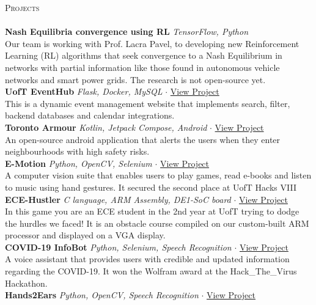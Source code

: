 \documentclass[a4paper]{article}
\newcommand{\lineunder} {
    \vspace*{-8pt} \\
    \hspace*{-18pt} \hrulefill \\
}
\newcommand{\header} [1] {
    {\hspace*{-18pt}\vspace*{6pt} \textsc{#1}}
    \vspace*{-6pt} \lineunder
}
\begin{document}
\header{Projects}
{\textbf{Nash Equilibria convergence using RL}} {\sl TensorFlow, Python} \\
Our team is working with Prof. Lacra Pavel, to developing new Reinforcement Learning (RL) algorithms that seek convergence to a Nash Equilibrium in networks
 with partial information like those found in autonomous vehicle networks and smart power grids. The research is not open-source yet.\\
\vspace*{2mm}
{\textbf{UofT EventHub}} {\sl Flask, Docker, MySQL} $\cdot$ \href{https://netninjahub.onrender.com/}{View Project}\\
This is a dynamic event management website that implements search, filter, backend databases and calendar integrations. \\
\vspace*{2mm}
{\textbf{Toronto Armour}} {\sl Kotlin, Jetpack Compose, Android} $\cdot$ \href{https://tinyurl.com/4jxuna82}{View Project} \\
An open-source android application that alerts the users when they enter neighbourhoods with high safety risks.\\
\vspace*{2mm}
{\textbf{E-Motion}} {\sl Python, OpenCV, Selenium} $\cdot$ \href{https://tinyurl.com/cyhtt8jr}{View Project} \\
A computer vision suite that enables users to play games, read e-books and listen to music using hand gestures. It secured the second place at UofT Hacks VIII\\
\vspace*{2mm}
{\textbf{ECE-Hustler}} {\sl C language, ARM Assembly, DE1-SoC board} $\cdot$ \href{https://tinyurl.com/d38wrur3}{View Project} \\
In this game you are an ECE student in the 2nd year at UofT trying to dodge the hurdles we faced! It is an obstacle course compiled on our custom-built ARM processor and displayed on a VGA display.\\
\vspace*{2mm}
{\textbf{COVID-19 InfoBot}} {\sl Python, Selenium, Speech Recognition} $\cdot$ \href{https://tinyurl.com/ub8uyavj}{View Project} \\
A voice assistant that provides users with credible and updated information regarding the COVID-19. It won the Wolfram award at the Hack\_The\_Virus Hackathon.\\
\vspace*{2mm}
{\textbf{Hands2Ears}} {\sl Python, OpenCV, Speech Recognition} $\cdot$ \href{https://tinyurl.com/65ftaddu}{View Project} \\
\end{document}
